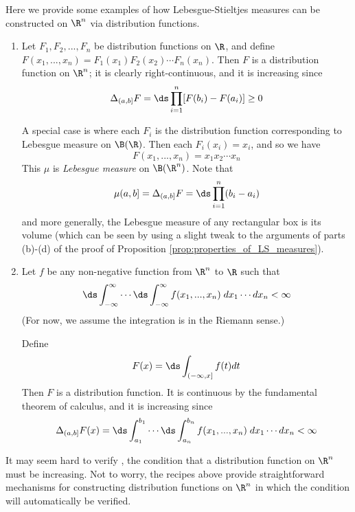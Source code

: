 \documentclass{article} %
\begin{document}
Here we provide some examples of how Lebesgue-Stieltjes measures can be constructed on $\R^n$ via distribution functions.

\begin{enumerate}
\item Let $F_1,F_2,...,F_n$ be distribution functions on $\R$, and define $F(x_1,...,x_n) = F_1(x_1) F_2(x_2) \cdots F_n(x_n)$.  Then $F$ is a distribution function on $\R^n$; it is clearly right-continuous, and it is increasing since
\[ \Delta_{(a,b]} F =\ds\prod_{i=1}^n [F(b_i) - F(a_i)] \geq 0 \]
	
A special case is where each $F_i$ is the distribution function corresponding to Lebesgue measure on $\B(\R)$.  Then each $F_i(x_i) = x_i$, and so we have
\[ F(x_1,...,x_n) = x_1x_2 \cdots x_n\]
This $\mu$ is \textit{Lebesgue measure} on $\B(\R^n)$.  Note that 
\[ \mu(a,b] = \Delta_{(a,b]} F = \ds\prod_{i=1}^n (b_i-a_i) \]
and more generally, the Lebesgue measure of any rectangular box is its volume (which can be seen by using a slight tweak to the arguments of parts (b)-(d) of the proof of Proposition \ref{prop:properties_of_LS_measures}). 
\item Let $f$ be any non-negative function from $\R^n$ to $\R$ such that 
\[ \ds\int_{-\infty}^\infty \cdots  \ds\int_{-\infty}^\infty f(x_1,...,x_n) \; dx_1 \cdots dx_n < \infty \]
(For now, we assume the integration is in the Riemann sense.)

Define 
\[ F(x) = \ds\int_{(-\infty,x]} f(t) dt \]
Then $F$ is a distribution function. It is continuous by the fundamental theorem of calculus, and it is increasing since
\[ \Delta_{(a,b]} F(x) = \ds\int_{a_1}^{b_1} \cdots  \ds\int_{a_n}^{b_n} f(x_1,...,x_n) \; dx_1 \cdots dx_n < \infty \]  
\end{enumerate}


\begin{remark}

It may seem hard to verify , the condition that a distribution function on $\R^n$ must be increasing.  Not to worry, the recipes above provide straightforward mechanisms for constructing distribution functions on $\R^n$ in which the condition will automatically be verified.
\end{remark}
\end{document}
